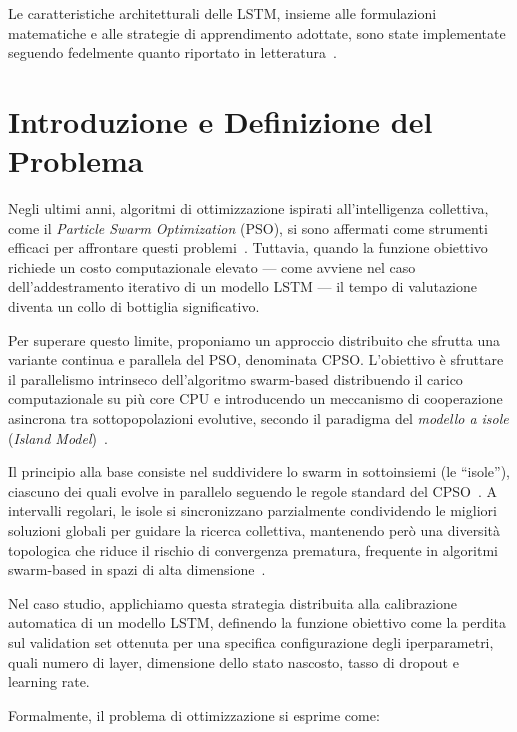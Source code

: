 \documentclass{article}
\begin{document}
Le caratteristiche architetturali delle LSTM, insieme alle formulazioni matematiche e alle strategie di 
apprendimento adottate, sono state implementate seguendo fedelmente quanto riportato in 
letteratura~\cite{hochreiter1997long, graves2013speech, greff2017lstm}.

\section{Introduzione e Definizione del Problema}

Negli ultimi anni, algoritmi di ottimizzazione ispirati all’intelligenza collettiva, come il 
\textit{Particle Swarm Optimization} (PSO), si sono affermati come strumenti efficaci per affrontare questi 
problemi~\cite{kennedy1995particle, eberhart2001pso}. Tuttavia, quando la funzione obiettivo richiede un costo 
computazionale elevato — come avviene nel caso dell’addestramento iterativo di un modello LSTM — il tempo di 
valutazione diventa un collo di bottiglia significativo.

Per superare questo limite, proponiamo un approccio distribuito che sfrutta una variante continua e parallela del 
PSO, denominata CPSO. L’obiettivo è sfruttare il parallelismo intrinseco dell’algoritmo swarm-based distribuendo 
il carico computazionale su più core CPU e introducendo un meccanismo di cooperazione asincrona tra sottopopolazioni 
evolutive, secondo il paradigma del \textit{modello a isole} (\textit{Island Model})~\cite{cantupaz1998survey, tomassini2005spatially}.

Il principio alla base consiste nel suddividere lo swarm in sottoinsiemi (le “isole”), ciascuno dei quali evolve 
in parallelo seguendo le regole standard del CPSO~\cite{professoressa}. A intervalli regolari, le isole si 
sincronizzano parzialmente condividendo le migliori soluzioni globali per guidare la ricerca collettiva, mantenendo 
però una diversità topologica che riduce il rischio di convergenza prematura, frequente in algoritmi swarm-based in 
spazi di alta dimensione~\cite{omran2005dynamic}.

Nel caso studio, applichiamo questa strategia distribuita alla calibrazione automatica di un modello LSTM, 
definendo la funzione obiettivo come la perdita sul validation set ottenuta per una specifica configurazione degli 
iperparametri, quali numero di layer, dimensione dello stato nascosto, tasso di dropout e learning rate.

Formalmente, il problema di ottimizzazione si esprime come:
\end{document}
